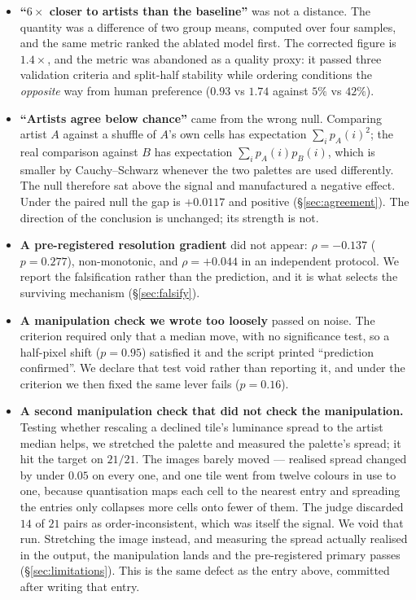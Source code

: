 \documentclass{article}
\begin{document}
\begin{itemize}

\item \textbf{``$6\times$ closer to artists than the baseline''} was not a
distance. The quantity was a difference of two group means, computed over
four samples, and the same metric ranked the ablated model first. The
corrected figure is $1.4\times$, and the metric was abandoned as a quality
proxy: it passed three validation criteria and split-half stability while
ordering conditions the \emph{opposite} way from human preference
($0.93$ vs $1.74$ against $5\%$ vs $42\%$).

\item \textbf{``Artists agree below chance''} came from the wrong null.
Comparing artist $A$ against a shuffle of $A$'s own cells has expectation
$\sum_i p_A(i)^2$; the real comparison against $B$ has expectation
$\sum_i p_A(i)p_B(i)$, which is smaller by Cauchy--Schwarz whenever the two
palettes are used differently. The null therefore sat above the signal and
manufactured a negative effect. Under the paired null the gap is $+0.0117$ and
positive (\S\ref{sec:agreement}). The direction of the conclusion is
unchanged; its strength is not.

\item \textbf{A pre-registered resolution gradient} did not appear:
$\rho{=}-0.137$ ($p{=}0.277$), non-monotonic, and $\rho{=}+0.044$ in an
independent protocol. We report the falsification rather than the prediction,
and it is what selects the surviving mechanism (\S\ref{sec:falsify}).

\item \textbf{A manipulation check we wrote too loosely} passed on noise. The
criterion required only that a median move, with no significance test, so a
half-pixel shift ($p{=}0.95$) satisfied it and the script printed
``prediction confirmed''. We declare that test void rather than reporting it,
and under the criterion we then fixed the same lever fails ($p{=}0.16$).

\item \textbf{A second manipulation check that did not check the
manipulation.} Testing whether rescaling a declined tile's luminance spread
to the artist median helps, we stretched the palette and measured the
palette's spread; it hit the target on $21/21$. The images barely moved ---
realised spread changed by under $0.05$ on every one, and one tile went from
twelve colours in use to one, because quantisation maps each cell to the
nearest entry and spreading the entries only collapses more cells onto fewer
of them. The judge discarded $14$ of $21$ pairs as order-inconsistent, which
was itself the signal. We void that run. Stretching the image instead, and
measuring the spread actually realised in the output, the manipulation lands
and the pre-registered primary passes (\S\ref{sec:limitations}). This is the
same defect as the entry above, committed after writing that entry.


\end{itemize}
\end{document}
